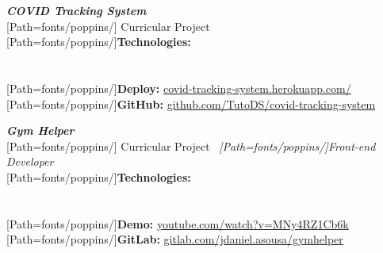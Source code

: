 \begin{minipage}{.5\textwidth}
\textbf{\textit{COVID Tracking System}}\\[3pt]
{
	\scriptsize
	[Path=fonts/poppins/]
	Curricular Project\\[2pt]

	{[Path=fonts/poppins/]\textbf{Technologies:}}\\
	    \\[1pt]  \\[2pt]

	{[Path=fonts/poppins/]\textbf{Deploy:}} \href{https://covid-tracking-system.herokuapp.com/}{covid-tracking-system.herokuapp.com/}\\
	{[Path=fonts/poppins/]\textbf{GitHub:}} \href{https://github.com/TutoDS/covid-tracking-system}{github.com/TutoDS/covid-tracking-system}
}
\end{minipage}
\begin{minipage}{.5\textwidth}
	\textbf{\textit{Gym Helper}}\\[3pt]
	{
		\scriptsize
		[Path=fonts/poppins/]
		Curricular Project \textemdash~\textit{[Path=fonts/poppins/]Front-end Developer}\\[2pt]

		{[Path=fonts/poppins/]\textbf{Technologies:}}\\
		   \\ \\[2pt]

		{[Path=fonts/poppins/]\textbf{Demo:}} \href{https://www.youtube.com/watch?v=MNy4RZ1Cb6k}{youtube.com/watch?v=MNy4RZ1Cb6k}\\
		{[Path=fonts/poppins/]\textbf{GitLab:}} \href{https://gitlab.com/jdaniel.asousa/gymhelper}{gitlab.com/jdaniel.asousa/gymhelper}
	}
\end{minipage}

\vspace{10pt}

